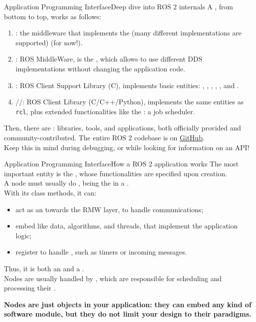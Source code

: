 \begin{frame}{Application Programming Interface}{Deep dive into ROS 2 internals}
	A , from bottom to top, works as follows:
	\begin{enumerate}
		\item {}: the middleware that implements the  (many different implementations are supported) (for now!).
		\item {}: ROS MiddleWare, is the , which allows to use different DDS implementations without changing the application code.
		\item {}: ROS Client Support Library (C), implements basic entities: , , , , , and .
		\item {}//: ROS Client Library (C/C++/Python), implements the same entities as \texttt{rcl}, plus extended functionalities like the : a job scheduler.
	\end{enumerate}
	Then, there are : libraries, tools, and applications, both officially provided and community-contributed. The entire ROS 2 codebase is on \href{https://github.com/ros2}{\color{blue}\underline{GitHub}}.\\
	Keep this in mind during debugging, or while looking for information on an API!
\end{frame}
\begin{frame}{Application Programming Interface}{How a ROS 2 application works}
	The most important entity is the , whose functionalities are specified upon creation.\\
	A node must usually do , being the  in a .\\
	With its class methods, it can:
	\begin{itemize}
		\item act as an  towards the RMW layer, to handle communications;
		\item embed  like data, algorithms, and threads, that implement the application logic;
		\item register  to handle , such as timers or incoming messages.
	\end{itemize}
	Thus, it is both an  and a .\\
	Nodes are usually handled by , which are responsible for scheduling and processing their .
	\begin{block}{}
		\centering
		\textbf{Nodes are just objects in your application: they can embed any kind of software module, but they do not limit your design to their paradigms.}
	\end{block}
\end{frame}

